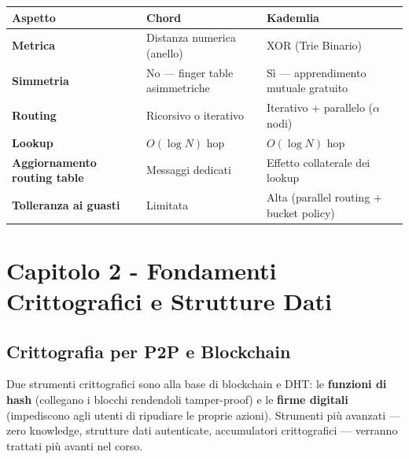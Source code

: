 \documentclass[
  italian,
  openany]{book}
\newcounter{none} %
\begin{document}
{\def\LTcaptype{none} %
\begin{longtable}[]{@{}
  >{\raggedright\arraybackslash}p{}
  >{\raggedright\arraybackslash}p{}
  >{\raggedright\arraybackslash}p{}@{}}
\toprule\noalign{}
\begin{minipage}[b]{\linewidth}\raggedright
Aspetto
\end{minipage} & \begin{minipage}[b]{\linewidth}\raggedright
Chord
\end{minipage} & \begin{minipage}[b]{\linewidth}\raggedright
Kademlia
\end{minipage} \\
\midrule\noalign{}
\endhead
\bottomrule\noalign{}
\endlastfoot
\textbf{Metrica} & Distanza numerica (anello) & XOR (Trie Binario) \\
\textbf{Simmetria} & No --- finger table asimmetriche & Sì ---
apprendimento mutuale gratuito \\
\textbf{Routing} & Ricorsivo o iterativo & Iterativo + parallelo
(\(\alpha\) nodi) \\
\textbf{Lookup} & \(O(\log N)\) hop & \(O(\log N)\) hop \\
\textbf{Aggiornamento routing table} & Messaggi dedicati & Effetto
collaterale dei lookup \\
\textbf{Tolleranza ai guasti} & Limitata & Alta (parallel routing +
bucket policy) \\
\end{longtable}
}

\newpage

\chapter{Capitolo 2 - Fondamenti Crittografici e Strutture
Dati}\label{capitolo-2---fondamenti-crittografici-e-strutture-dati}

\section{Crittografia per P2P e
Blockchain}\label{crittografia-per-p2p-e-blockchain}

Due strumenti crittografici sono alla base di blockchain e DHT: le
\textbf{funzioni di hash} (collegano i blocchi rendendoli tamper-proof)
e le \textbf{firme digitali} (impediscono agli utenti di ripudiare le
proprie azioni). Strumenti più avanzati --- zero knowledge, strutture
dati autenticate, accumulatori crittografici --- verranno trattati più
avanti nel corso.
\end{document}
